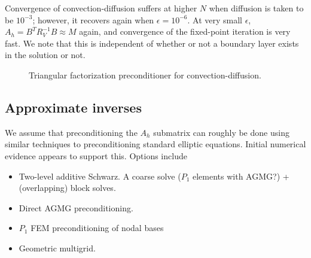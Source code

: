 \documentclass{article}
\begin{document}
Convergence of convection-diffusion suffers at higher $N$ when diffusion is taken to be $10^{-3}$; however, it recovers again when $\epsilon = 10^{-6}$.  At very small $\epsilon$, $A_h = B^TR_V^{-1}B \approx M$ again, and convergence of the fixed-point iteration is very fast.  We note that this is independent of whether or not a boundary layer exists in the solution or not.  
\begin{figure}
\centering
{}
\caption{Triangular factorization preconditioner for convection-diffusion.}
\end{figure}

\subsection{Approximate inverses}

We assume that preconditioning the $A_h$ submatrix can roughly be done using similar techniques to preconditioning standard elliptic equations.  Initial numerical evidence appears to support this.  Options include 
\begin{itemize}
\item Two-level additive Schwarz.  A coarse solve ($P_1$ elements with AGMG?) + (overlapping) block solves. 
\item Direct AGMG preconditioning.  
\item $P_1$ FEM preconditioning of nodal bases 
\item Geometric multigrid.  
\end{itemize}
\end{document}
